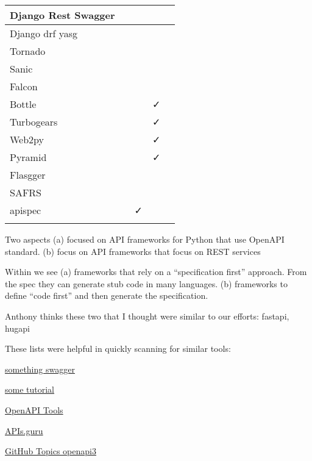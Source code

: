 \documentclass[conference]{IEEEtran}
\newcommand{\OK}{\faCheck}
\newcommand{\NO}{\faTimes}
\begin{document}
\begin{table*}[htb]
\begin{tabular}{|l|l|l|l|l|}
Django Rest Swagger & \cite{www-django-rest-swagger} & \NO &  &  \\ \hline
Django drf yasg &  \cite{www-django-rest-swagger}& \NO  &  &  \\ \hline
Tornado &  \cite{www-tornado} &  &  &  \\ \hline
Sanic & \cite{www-sanic} &  &  &  \\ \hline
Falcon &  \cite{www-falcon} &  &  &  \\ \hline
Bottle &  \cite{www-bottle} &  & \OK &  \\ \hline
Turbogears &  \cite{www-turbogears} &  & \OK &  \\ \hline
Web2py & \cite{www-web2py} &  & \OK &  \\ \hline
Pyramid &  \cite{www-pyramid} &  & \OK  &  \\ \hline
Flasgger &  \cite{www-flasgger} &  &  &  \\ \hline
SAFRS & \cite{www-safrs} &  &  &  \\ \hline
apispec & \cite{www-apispec} & \OK  &  &  \\ \hline
&  &  &  &  \\ \hline

\end{tabular}

\end{table*}

Two aspects
(a) focused on API frameworks for Python that use OpenAPI standard. 
(b) focus on API frameworks that focus on REST services


Within we see  (a) frameworks that rely on a ``specification first'' approach.  From the spec they can generate stub code in many languages. 
(b) frameworks to define ``code first'' and then generate the specification.

Anthony thinks these two that I thought were  similar to our efforts: fastapi, hugapi


These lists were helpful in quickly scanning for similar tools:

\begin {description}
\item[\href{https://swagger.io/tools/open-source/open-source-integrations/}{something swagger}] \cite{www-swagger-integration}

\item[\href{https://www.blazemeter.com/blog/how-to-generate-openapi-definitions-from-code}{some tutorial}] \cite{www-openapi-from-code}

\item[\href{https://openapi.tools/}{OpenAPI Tools}] \cite{www-openapi-tools}

\item[\href{https://apis.guru/awesome-openapi3/category.html}{APIs.guru}]\cite{www-apis-guru}

\item[\href{https://github.com/topics/openapi3}{GitHub Topics openapi3}]\cite{???}


\end{description}
\end{document}

